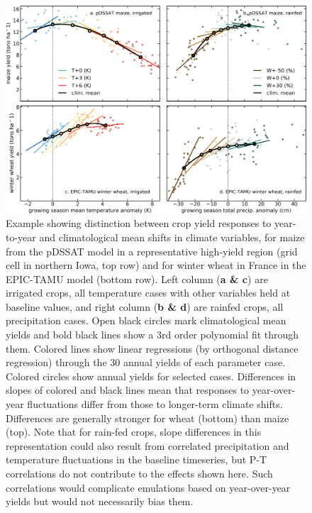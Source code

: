 \documentclass[gmd, manuscript]{copernicus} %
\begin{document}
\begin{figure}[ht]
\centering
   \includegraphics[width=15cm]{figures/phase_II_em_figure_1.png}
   \caption{
	   Example showing distinction between crop yield responses to year-to-year and climatological mean shifts in climate variables, for maize from the pDSSAT model in a representative high-yield region (grid cell in northern Iowa, top row) and for winter wheat in France in the EPIC-TAMU model (bottom row).
	Left column (\textbf{a \& c}) are irrigated crops, all temperature cases %
	with other variables held at baseline values, and right column (\textbf{b \& d}) are rainfed crops, all precipitation cases. %
       Open black circles mark climatological mean yields and bold black lines show a 3rd order polynomial fit through them. 
       Colored lines show linear regressions (by orthogonal distance regression) through the 30 annual yields of each parameter case. 
       Colored circles show annual yields for selected cases. %
       Differences in slopes of colored and black lines mean that responses to year-over-year fluctuations differ from those to longer-term climate shifts. Differences are generally stronger for wheat (bottom) than maize (top).  
       Note that for rain-fed crops, slope differences in this representation could also result from correlated precipitation and temperature fluctuations in the baseline timeseries, but P-T correlations do not contribute to the effects shown here. 
       Such correlations would complicate emulations based on year-over-year yields but would not necessarily bias them.
}
\end{figure}
\end{document}
